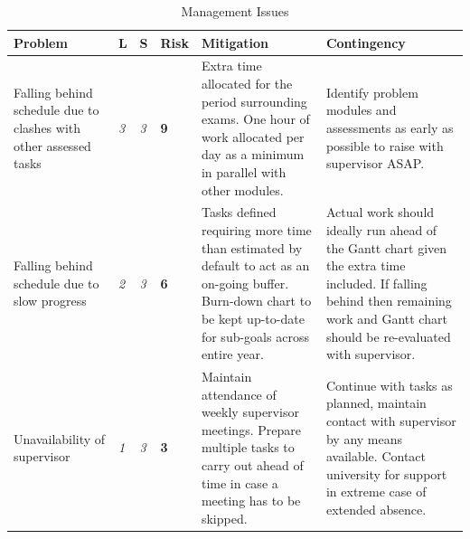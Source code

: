 \documentclass[12pt]{article}
\begin{document}
	\begin{table}[h!]
		\centering
		\caption{Management Issues}
		\label{table:risk1}
		\footnotesize
		\begin{tabular}{|>{\centering}m{1.5in} |>{\centering}m{0.1in} |>{\centering}m{0.1in} |>{\centering}m{0.3in} |>{\centering}m{1.8in} |>{\centering\arraybackslash}m{1.8in}|}
			\hline
			\textbf{Problem}                                                 & \textbf{L}                & \textbf{S}                  & \textbf{Risk}                      & \textbf{Mitigation}                                                                                                                                               & \textbf{Contingency}                                                                                                                                                                 \\ \hline
			Falling behind schedule due to clashes with other assessed tasks & \cellcolor[HTML]{FFC702}\textit{3} & \cellcolor[HTML]{FFC702}\textit{3} & \cellcolor[HTML]{FFC702}\textbf{9} & Extra time allocated for the period surrounding exams. One hour of work allocated per day as a minimum in parallel with other modules.                            & Identify problem modules and assessments as early as possible to raise with supervisor ASAP.                                                                                         \\ \hline
			Falling behind schedule due to slow progress                     & \cellcolor[HTML]{F8FF00}\textit{2} & \cellcolor[HTML]{FFC702}\textit{3} & \cellcolor[HTML]{FFC702}\textbf{6} & Tasks defined requiring more time than estimated by default to act as an on-going buffer. Burn-down chart to be kept up-to-date for sub-goals across entire year. & Actual work should ideally run ahead of the Gantt chart given the extra time included. If falling behind then remaining work and Gantt chart should be re-evaluated with supervisor. \\ \hline
			Unavailability of supervisor                                     & \cellcolor[HTML]{ABCB00}\textit{1} & \cellcolor[HTML]{FFC702}\textit{3} & \cellcolor[HTML]{F8FF00}\textbf{3} & Maintain attendance of weekly supervisor meetings. Prepare multiple tasks to carry out ahead of time in case a meeting has to be skipped.                         & Continue with tasks as planned, maintain contact with supervisor by any means available. Contact university for support in extreme case of extended absence.                         \\ \hline

\end{tabular}
\end{table}
\end{document}
